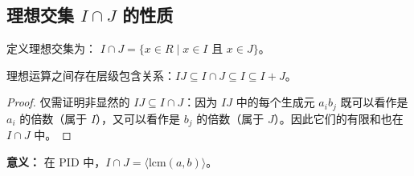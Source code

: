 \documentclass[11pt]{article}
\begin{document}
\subsection{理想交集 $I \cap J$ 的性质}
\begin{cndefinition}[理想交集]
定义理想交集为： $I \cap J = \{ x \in R \mid x \in I \text{ 且 } x \in J \}$。
\end{cndefinition}
\begin{cnproperty}
理想运算之间存在层级包含关系：$IJ \subseteq I \cap J \subseteq I \subseteq I+J$。
\end{cnproperty}
\begin{proof}
仅需证明非显然的 $IJ \subseteq I \cap J$：因为 $IJ$ 中的每个生成元 $a_i b_j$ 既可以看作是 $a_i$ 的倍数（属于 $I$），又可以看作是 $b_j$ 的倍数（属于 $J$）。因此它们的有限和也在 $I \cap J$ 中。
\end{proof}
\noindent \textbf{意义：} 在 PID 中，$I \cap J = \langle \text{lcm}(a,b) \rangle$。
\end{document}
